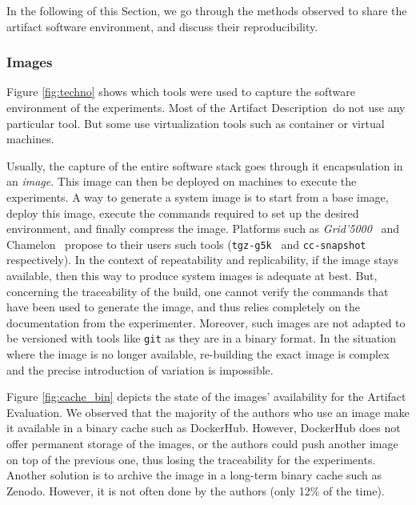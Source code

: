 \documentclass[sigconf,natbib=false]{acmart}
\newcommand{\grid}{\emph{Grid'5000}}
\newcommand{\ad}{Artifact Description}
\newcommand{\aeval}{Artifact Evaluation}
\begin{document}
In the following of this Section, we go through the methods observed to share the artifact software environment, and discuss their reproducibility.

\subsubsection{Images}\label{sec:sop:sw:images}

Figure \ref{fig:techno} shows which tools were used to capture the software environment of the experiments.
Most of the \ad\ do not use any particular tool.
But some use virtualization tools such as container or virtual machines.

Usually, the capture of the entire software stack goes through it encapsulation in an \emph{image}.
This image can then be deployed on machines to execute the experiments.
A way to generate a system image is to start from a base image, deploy this image, execute the commands required to set up the desired environment, and finally compress the image.
Platforms such as \grid\ \cite{grid5000} and Chamelon\ \cite{chameleon} propose to their users such tools (\texttt{tgz-g5k}\ \cite{tgz-g5k} and \texttt{cc-snapshot}\ \cite{cc-snapshot} respectively).
In the context of repeatability and replicability, if the image stays available, then this way to produce system images is adequate at best.
But, concerning the traceability of the build, one cannot verify the commands that have been used to generate the image, and thus relies completely on the documentation from the experimenter.
Moreover, such images are not adapted to be versioned with tools like \texttt{git} as they are in a binary format.
In the situation where the image is no longer available, re-building the exact image is complex and the precise introduction of variation is impossible.

Figure \ref{fig:cache_bin} depicts the state of the images' availability for the \aeval.
We observed that the majority of the authors who use an image make it available in a binary cache such as DockerHub. 
However, DockerHub does not offer permanent storage of the images, or the authors could push another image on top of the previous one, thus losing the traceability for the experiments.
Another solution is to archive the image in a long-term binary cache such as Zenodo.
However, it is not often done by the authors (only 12\% of the time).
\end{document}

